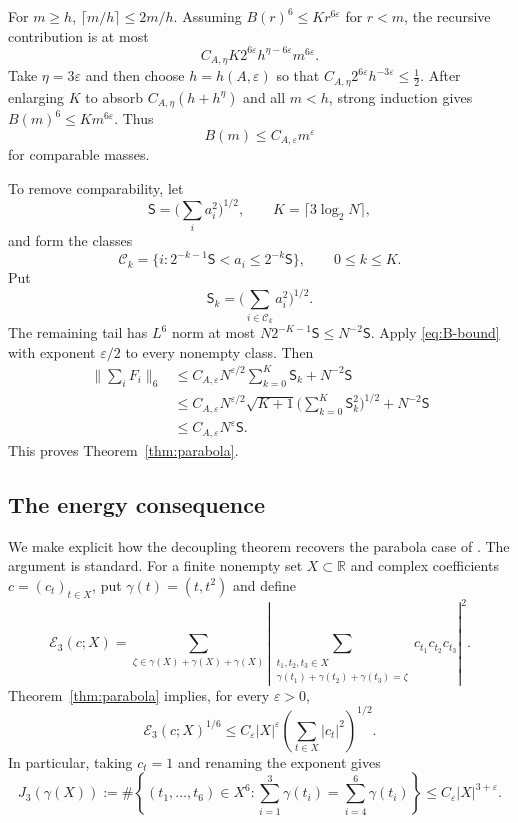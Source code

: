 \documentclass{amsart}
\numberwithin{equation}{section}
\newcommand{\R}{\mathbb{R}}
\begin{document}
For $m\ge h$, $\lceil m/h\rceil\le2m/h$.  Assuming
$B(r)^6\le K r^{6\varepsilon}$ for $r<m$, the recursive contribution is at most
\[
 C_{A,\eta}K2^{6\varepsilon}h^{\eta-6\varepsilon}m^{6\varepsilon}.
\]
Take $\eta=3\varepsilon$ and then choose $h=h(A,\varepsilon)$ so that
$C_{A,\eta}2^{6\varepsilon}h^{-3\varepsilon}\le\tfrac12$.  After enlarging $K$ to absorb
$C_{A,\eta}(h+h^\eta)$ and all $m<h$, strong induction gives
$B(m)^6\le K m^{6\varepsilon}$.  Thus
\begin{equation}\label{eq:B-bound}
 B(m)\le C_{A,\varepsilon}m^\varepsilon
\end{equation}
for comparable masses.

To remove comparability, let
\[
 \mathsf S=\Big(\sum_i a_i^2\Big)^{1/2},
 \qquad K=\lceil3\log_2N\rceil,
\]
and form the classes
\[
 \mathcal C_k=\{i:2^{-k-1}\mathsf S<a_i\le2^{-k}\mathsf S\},
 \qquad 0\le k\le K.
\]
Put
\[
 \mathsf S_k=\Big(\sum_{i\in\mathcal C_k}a_i^2\Big)^{1/2}.
\]
The remaining tail has $L^6$ norm at most
$N2^{-K-1}\mathsf S\le N^{-2}\mathsf S$.  Apply
\eqref{eq:B-bound} with exponent $\varepsilon/2$ to every nonempty class.  Then
\begin{align*}
 \Big\|\sum_iF_i\Big\|_6
 &\le C_{A,\varepsilon}N^{\varepsilon/2}\sum_{k=0}^K\mathsf S_k
      +N^{-2}\mathsf S\\
 &\le C_{A,\varepsilon}N^{\varepsilon/2}\sqrt{K+1}
      \Big(\sum_{k=0}^K\mathsf S_k^2\Big)^{1/2}+N^{-2}\mathsf S\\
 &\le C_{A,\varepsilon}N^\varepsilon\mathsf S.
\end{align*}
This proves Theorem~\ref{thm:parabola}.


\medskip 

\subsection{The energy consequence}\label{sec:parabola-energy}

We make explicit how the decoupling theorem recovers the parabola case of
\cite[Theorem~1.1]{Cushman-Demeter-Wu}. The argument is standard. For a finite nonempty set $X\subset\R$ and complex
coefficients $c=(c_t)_{t\in X}$, put $\gamma(t)=(t,t^2)$ and define
\[
 \mathcal E_3(c;X)=
 \sum_{\zeta\in\gamma(X)+\gamma(X)+\gamma(X)}
 \left|
 \sum_{\substack{t_1,t_2,t_3\in X\\
       \gamma(t_1)+\gamma(t_2)+\gamma(t_3)=\zeta}}
       c_{t_1}c_{t_2}c_{t_3}
 \right|^2.
\]
Theorem~\ref{thm:parabola} implies, for every $\varepsilon>0$,
\[
 \mathcal E_3(c;X)^{1/6}
 \le C_\varepsilon |X|^\varepsilon
       \left(\sum_{t\in X}|c_t|^2\right)^{1/2}.
\]
In particular, taking $c_t=1$ and renaming the exponent gives
\[
 J_3(\gamma(X))
 :=\#\left\{(t_1,\ldots,t_6)\in X^6:
       \sum_{i=1}^3\gamma(t_i)=\sum_{i=4}^6\gamma(t_i)\right\}
 \le C_\varepsilon |X|^{3+\varepsilon}.
\]
\end{document}
